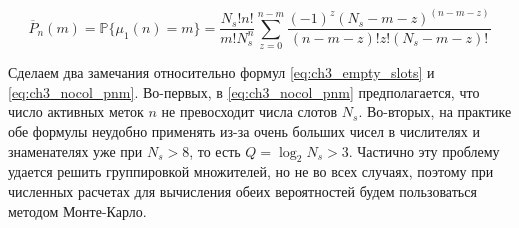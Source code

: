 \begin{equation}\label{eq:ch3_nocol_pnm}
	\overline{P}_n(m) = \mathbb{P}\{ \mu_1(n) = m \} = \frac{N_s! n!}{m! N_s^n} \sum\limits_{z=0}^{n-m}
		\frac{(-1)^z (N_s - m - z)^{(n - m - z)}}{(n - m - z)! z! (N_s - m - z)!}
\end{equation}

Сделаем два замечания относительно формул \eqref{eq:ch3_empty_slots} и \eqref{eq:ch3_nocol_pnm}. Во-первых, в \eqref{eq:ch3_nocol_pnm} предполагается, что число активных меток $n$ не превосходит числа слотов $N_s$. Во-вторых, на практике обе формулы неудобно применять из-за очень больших чисел в числителях и знаменателях уже при $N_s > 8$, то есть $Q = \log_2 N_s > 3$. Частично эту проблему удается решить группировкой множителей, но не во всех случаях, поэтому при численных расчетах для вычисления обеих вероятностей будем пользоваться методом Монте-Карло.

